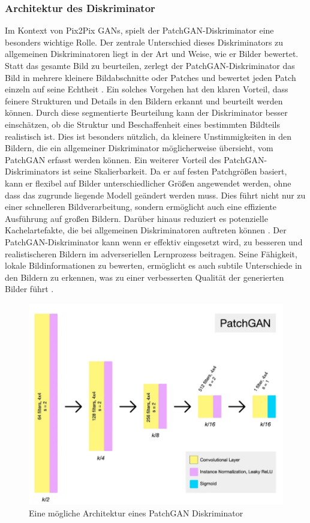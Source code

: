\subsubsection{Architektur des Diskriminator}
\label{sec:PatchGAN}
Im Kontext von Pix2Pix GANs, spielt der PatchGAN-Diskriminator eine besonders wichtige Rolle. Der zentrale Unterschied dieses Diskriminators zu allgemeinen Diskriminatoren liegt in der Art und Weise, wie er Bilder bewertet. Statt das gesamte Bild zu beurteilen, zerlegt der PatchGAN-Diskriminator das Bild in mehrere kleinere Bildabschnitte oder Patches und bewertet jeden Patch einzeln auf seine Echtheit \cite{PhillipIsola.}. \newline
Ein solches Vorgehen hat den klaren Vorteil, dass feinere Strukturen und Details in den Bildern erkannt und beurteilt werden können. Durch diese segmentierte Beurteilung kann der Diskriminator besser einschätzen, ob die Struktur und Beschaffenheit eines bestimmten Bildteils realistisch ist. Dies ist besonders nützlich, da kleinere Unstimmigkeiten in den Bildern, die ein allgemeiner Diskriminator möglicherweise übersieht, vom PatchGAN erfasst werden können. \newline
Ein weiterer Vorteil des PatchGAN-Diskriminators ist seine Skalierbarkeit. Da er auf festen Patchgrößen basiert, kann er flexibel auf Bilder unterschiedlicher Größen angewendet werden, ohne dass das zugrunde liegende Modell geändert werden muss. Dies führt nicht nur zu einer schnelleren Bildverarbeitung, sondern ermöglicht auch eine effiziente Ausführung auf großen Bildern. Darüber hinaus reduziert es potenzielle Kachelartefakte, die bei allgemeinen Diskriminatoren auftreten können \cite{PhillipIsola.}.\newline
Der PatchGAN-Diskriminator kann wenn er effektiv eingesetzt wird, zu besseren und realistischeren Bildern im adverseriellen Lernprozess beitragen. Seine Fähigkeit, lokale Bildinformationen zu bewerten, ermöglicht es auch subtile Unterschiede in den Bildern zu erkennen, was zu einer verbesserten Qualität der generierten Bilder führt \cite{PhillipIsola.}.

\begin{figure}[h]
	\centering
	\includegraphics[width=0.7\linewidth]{./images/cycleGanDiscriminatorArchitecutre.png}
	\caption{Eine mögliche Architektur eines PatchGAN Diskriminator\protect\footnotemark}
	\label{fig:PatchGANDiskriminator}
\end{figure}

